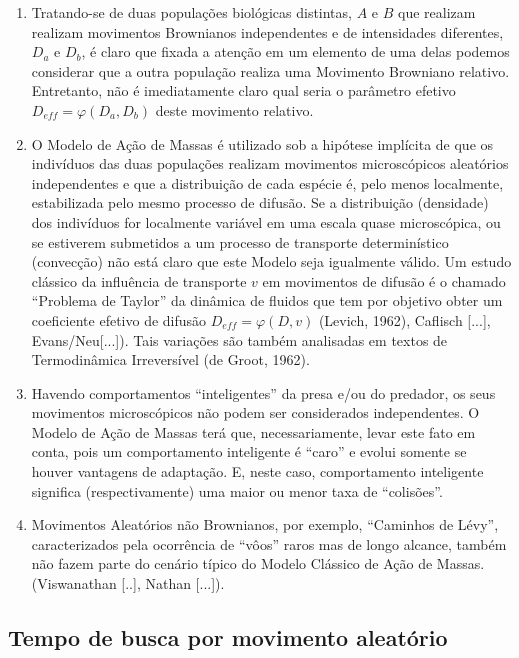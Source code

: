 \begin{enumerate}
    \item Tratando-se de duas populações biológicas distintas, \(A\) e \(B\) que realizam realizam movimentos Brownianos independentes e de intensidades diferentes, \(D_a\) e \(D_b\), é claro que fixada a atenção em um elemento de uma delas podemos considerar que a outra população realiza uma Movimento Browniano relativo. Entretanto, não é imediatamente claro qual seria o parâmetro efetivo \(D_{eff} = \varphi(D_a, D_b)\) deste movimento relativo.
    \item O Modelo de Ação de Massas é utilizado sob a hipótese implícita de que os indivíduos das duas populações realizam movimentos microscópicos aleatórios independentes e que a distribuição de cada espécie é, pelo menos localmente, estabilizada pelo mesmo processo de difusão. Se a distribuição (densidade) dos indivíduos for localmente variável em uma escala quase microscópica, ou se estiverem submetidos a um processo de transporte determinístico (convecção) não está claro que este Modelo seja igualmente válido. Um estudo clássico da influência de transporte \(v\) em movimentos de difusão é o chamado ``Problema de Taylor'' da dinâmica de fluidos que tem por objetivo obter um coeficiente efetivo de difusão \(D_{eff} = \varphi(D, v)\) (Levich, 1962), Caflisch [...], Evans/Neu[...]). Tais variações são também analisadas em textos de Termodinâmica Irreversível (de Groot, 1962).

    \item Havendo comportamentos ``inteligentes'' da presa e/ou do predador, os seus movimentos microscópicos não podem ser considerados independentes. O Modelo de Ação de Massas terá que, necessariamente, levar este fato em conta, pois um comportamento inteligente é ``caro'' e evolui somente se houver vantagens de adaptação. E, neste caso, comportamento inteligente significa (respectivamente) uma maior ou menor taxa de ``colisões''.
    \item Movimentos Aleatórios não Brownianos, por exemplo, ``Caminhos de Lévy'', caracterizados pela ocorrência de ``vôos'' raros mas de longo alcance, também não fazem parte do cenário típico do Modelo Clássico de Ação de Massas. (Viswanathan [..], Nathan [...]).
\end{enumerate}




\subsection{Tempo de busca por movimento aleatório}


